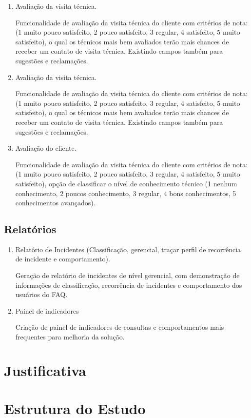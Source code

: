 \begin{enumerate}
	
	\item Avaliação da visita técnica.
	
	Funcionalidade de avaliação da visita técnica do cliente com critérios de nota:(1 muito pouco satisfeito, 2 pouco satisfeito, 3 regular, 4 satisfeito, 5 muito satisfeito), o qual os técnicos mais bem avaliados terão mais chances de receber um contato de visita técnica. Existindo campos também para sugestões e reclamações.
	
	
	\item Avaliação da visita técnica.
	
	Funcionalidade de avaliação da visita técnica do cliente com critérios de nota:(1 muito pouco satisfeito, 2 pouco satisfeito, 3 regular, 4 satisfeito, 5 muito satisfeito), o qual os técnicos mais bem avaliados terão mais chances de receber um contato de visita técnica. Existindo campos também para sugestões e reclamações.
	
	\item Avaliação do cliente.
	
	Funcionalidade de avaliação da visita técnica do cliente com critérios de nota:(1 muito pouco satisfeito, 2 pouco satisfeito, 3 regular, 4 satisfeito, 5 muito satisfeito), opção de classificar o nível de conhecimento técnico (1 nenhum conhecimento, 2 poucos conhecimento, 3 regular, 4 bons conhecimentos, 5 conhecimentos avançados).
	
\end{enumerate}

\subsection{Relatórios}

\begin{enumerate}
	
	\item Relatório de Incidentes (Classificação, gerencial, traçar perfil de recorrência de incidente e comportamento).
	
	Geração de relatório de incidentes de nível gerencial, com demonstração de informações de classificação, recorrência de incidentes e comportamento dos usuários do FAQ.
	
	\item Painel de indicadores
	
	Criação de painel de indicadores de consultas e comportamentos mais frequentes para melhoria da solução.
	
\end{enumerate}

\section{Justificativa}

\section{Estrutura do Estudo}


